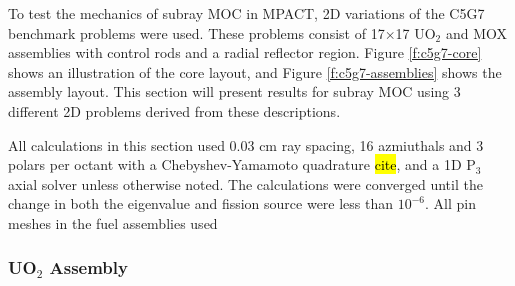To test the mechanics of subray MOC in MPACT, 2D variations of the C5G7 benchmark problems were used.  These problems consist of 17$\times$17 UO$_2$ and MOX assemblies with control rods and a radial reflector region.  Figure \ref{f:c5g7-core} shows an illustration of the core layout, and Figure \ref{f:c5g7-assemblies} shows the assembly layout.  This section will present results for subray MOC using 3 different 2D problems derived from these descriptions.

All calculations in this section used 0.03 cm ray spacing, 16 azmiuthals and 3 polars per octant with a Chebyshev-Yamamoto quadrature \hl{cite}, and a 1D P$_3$ axial solver unless otherwise noted.  The calculations were converged until the change in both the eigenvalue and fission source were less than $10^{-6}$.  All pin meshes in the fuel assemblies used 

\subsubsection{UO\texorpdfstring{$_2$}{2} Assembly}


